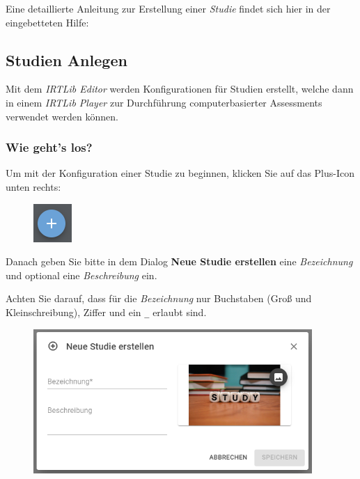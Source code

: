 \documentclass[
  letterpaper,
  DIV=11]{scrreprt}
\begin{document}
Eine detaillierte Anleitung zur Erstellung einer \emph{Studie} findet
sich hier in der eingebetteten Hilfe:

\begin{tcolorbox}[enhanced jigsaw, colbacktitle=quarto-callout-tip-color!10!white, coltitle=black, colframe=quarto-callout-tip-color-frame, leftrule=.75mm, breakable, opacitybacktitle=0.6, toprule=.15mm, title=\textcolor{quarto-callout-tip-color}{\faLightbulb}\hspace{0.5em}{Eingebettete Programmhilfe}, colback=white, titlerule=0mm, arc=.35mm, bottomtitle=1mm, toptitle=1mm, rightrule=.15mm, bottomrule=.15mm, left=2mm, opacityback=0]

\hypertarget{studien-anlegen-1}{%
\subsection{Studien Anlegen}\label{studien-anlegen-1}}

Mit dem \emph{IRTLib Editor} werden Konfigurationen für Studien
erstellt, welche dann in einem \emph{IRTLib Player} zur Durchführung
computerbasierter Assessments verwendet werden können.

\hypertarget{wie-gehts-los-1}{%
\subsubsection{Wie geht's los?}\label{wie-gehts-los-1}}

Um mit der Konfiguration einer Studie zu beginnen, klicken Sie auf das
Plus-Icon unten rechts:

\begin{figure}[H]

\includegraphics{img/icon-plus.png} \hfill{}

\end{figure}

Danach geben Sie bitte in dem Dialog \textbf{Neue Studie erstellen} eine
\emph{Bezeichnung} und optional eine \emph{Beschreibung} ein.

Achten Sie darauf, dass für die \emph{Bezeichnung} nur Buchstaben (Groß
und Kleinschreibung), Ziffer und ein \texttt{\_} erlaubt sind.

\begin{figure}[H]

\includegraphics[width=4.16667in,height=\textheight]{img/screenshot-new-study-empty-DEU.png} \hfill{}


\end{figure}
\end{tcolorbox}
\end{document}
